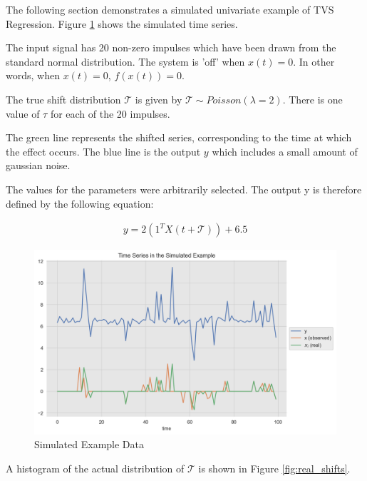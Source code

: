 \documentclass[11pt]{amsart}
\theoremstyle{definition}
\theoremstyle{definition}
\begin{document}
The following section demonstrates a simulated univariate example of TVS Regression. Figure \ref{fig:simulated_example} shows the simulated time series.

The input signal has 20 non-zero impulses which have been drawn from the standard normal distribution. The system is 'off' when $x(t) =0$. In other words, when $x(t) = 0$, $f(x(t)) = 0$. 

The true shift distribution $\mathcal{T}$ is given by $\mathcal{T} \sim Poisson(\lambda = 2)$. There is one value of $\tau$ for each of the 20 impulses.

The green line represents the shifted series, corresponding to the time at which the effect occurs. The blue line is the output $y$ which includes a small amount of gaussian noise.

The values for the parameters were arbitrarily selected. The output y is therefore defined by the following equation:


\begin{align}
    y = 2(1^TX(t + \mathcal{T})) + 6.5
\end{align}


\begin{center}
\begin{figure}
\includegraphics[scale=0.5]{images/simulated_example.png}
\caption{Simulated Example Data}
\label{fig:simulated_example}
\end{figure}
\end{center}

A histogram of the actual distribution of $\mathcal{T}$ is shown in Figure \ref{fig:real_shifts}.
\end{document}
